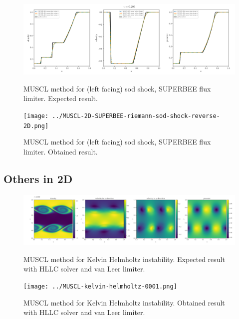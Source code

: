     \begin{figure}[htbp]
        \centering
        \includegraphics[width=.9\textwidth]{./figures/MUSCL-2D-SUPERBEE-riemann-sod-shock-reverse-2D.png}%
        \caption{MUSCL method for (left facing) sod shock, SUPERBEE flux limiter. Expected result.}
        \texttt{[image: ../MUSCL-2D-SUPERBEE-riemann-sod-shock-reverse-2D.png]}%
        \caption{MUSCL method for (left facing) sod shock, SUPERBEE flux limiter. Obtained result.}
    \end{figure}







\clearpage
\subsection{Others in 2D}

    \begin{figure}[htbp]
        \centering
        \includegraphics[width=.9\textwidth]{./figures/MUSCL-kelvin-helmholtz-0001.png}%
        \caption{MUSCL method for Kelvin Helmholtz instability. Expected result with HLLC solver and van Leer limiter.}
        \texttt{[image: ../MUSCL-kelvin-helmholtz-0001.png]}%
        \caption{MUSCL method for Kelvin Helmholtz instability. Obtained result with HLLC solver and van Leer limiter.}
    \end{figure}






















